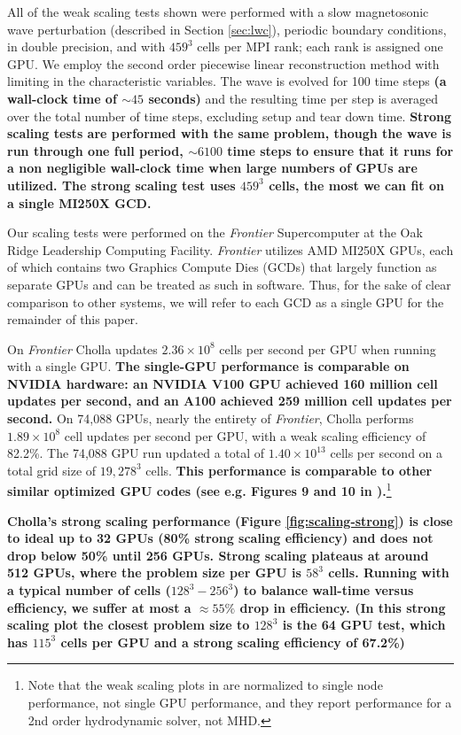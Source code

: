 \documentclass[modern, linenumbers]{aastex631}
\begin{document}
All of the weak scaling tests shown were performed with a slow magnetosonic wave perturbation (described in Section \ref{sec:lwc}), periodic boundary conditions, in double precision, and with $459^3$ cells per MPI rank; each rank is assigned one GPU. We employ the second order piecewise linear reconstruction method with limiting in the characteristic variables. The wave is evolved for 100 time steps \textbf{(a wall-clock time of $\sim45$ seconds)} and the resulting time per step is averaged over the total number of time steps, excluding setup and tear down time. \textbf{Strong scaling tests are performed with the same problem, though the wave is run through one full period, $\sim 6100$ time steps to ensure that it runs for a non negligible wall-clock time when large numbers of GPUs are utilized. The strong scaling test uses $459^3$ cells, the most we can fit on a single MI250X GCD.}

Our scaling tests were performed on the \textit{Frontier} Supercomputer at the Oak Ridge Leadership Computing Facility. \textit{Frontier} utilizes AMD MI250X GPUs, each of which contains two Graphics Compute Dies (GCDs) that largely function as separate GPUs and can be treated as such in software. Thus, for the sake of clear comparison to other systems, we will refer to each GCD as a single GPU for the remainder of this paper.

On \textit{Frontier} Cholla updates \textbf{$2.36\times10^8$} cells per second per GPU when running with a single GPU. \textbf{The single-GPU performance is comparable on NVIDIA hardware: an NVIDIA V100 GPU achieved 160 million cell updates per second, and an A100 achieved 259 million cell updates per second.} On 74,088 GPUs, nearly the entirety of \textit{Frontier}, Cholla performs \textbf{$1.89\times10^8$} cell updates per second per GPU, with a weak scaling efficiency of 82.2\%. The 74,088 GPU run updated a total of \textbf{$1.40\times10^{13}$} cells per second on a total grid size of $19,278^3$ cells. \textbf{This performance is comparable to other similar optimized GPU codes (see e.g. Figures 9 and 10 in \cite{parthenon_2023}).}\footnote{Note that the weak scaling plots in \cite{parthenon_2023} are normalized to single node performance, not single GPU performance, and they report performance for a 2nd order hydrodynamic solver, not MHD.}

\textbf{Cholla's strong scaling performance (Figure \ref{fig:scaling-strong}) is close to ideal up to 32 GPUs (80\% strong scaling efficiency) and does not drop below 50\% until 256 GPUs. Strong scaling plateaus at around 512 GPUs, where the problem size per GPU is $58^3$ cells. Running with a typical number of cells ($128^3 - 256^3$) to balance wall-time versus efficiency, we suffer at most a $\approx55\%$ drop in efficiency. (In this strong scaling plot the closest problem size to $128^3$ is the 64 GPU test, which has $115^3$ cells per GPU and a strong scaling efficiency of 67.2\%)}
\end{document}
